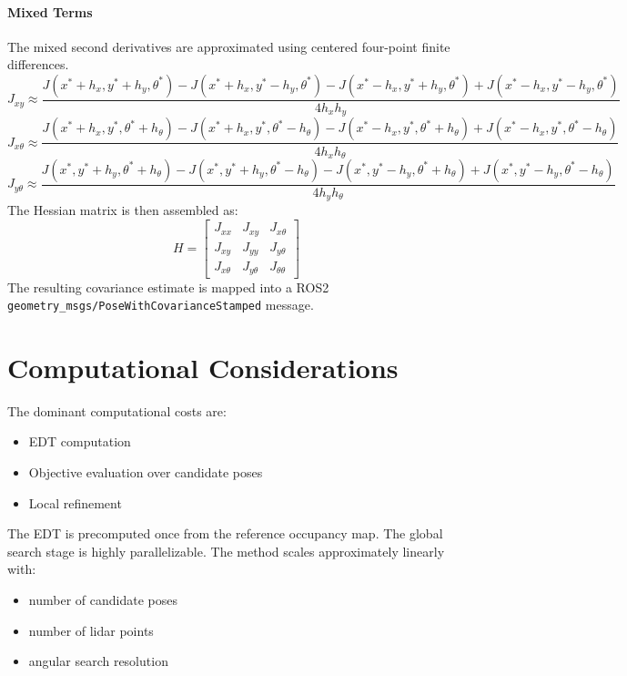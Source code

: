 \documentclass[11pt]{article}
\begin{document}
\paragraph{Mixed Terms}
The mixed second derivatives are approximated using centered
four-point finite differences.
\begin{equation}
J_{xy}
\approx
\frac{
J(x^*+h_x,y^*+h_y,\theta^*)
-
J(x^*+h_x,y^*-h_y,\theta^*)
-
J(x^*-h_x,y^*+h_y,\theta^*)
+
J(x^*-h_x,y^*-h_y,\theta^*)
}{
4 h_x h_y
}
\end{equation}
\begin{equation}
J_{x\theta}
\approx
\frac{
J(x^*+h_x,y^*,\theta^*+h_\theta)
-
J(x^*+h_x,y^*,\theta^*-h_\theta)
-
J(x^*-h_x,y^*,\theta^*+h_\theta)
+
J(x^*-h_x,y^*,\theta^*-h_\theta)
}{
4 h_x h_\theta
}
\end{equation}
\begin{equation}
J_{y\theta}
\approx
\frac{
J(x^*,y^*+h_y,\theta^*+h_\theta)
-
J(x^*,y^*+h_y,\theta^*-h_\theta)
-
J(x^*,y^*-h_y,\theta^*+h_\theta)
+
J(x^*,y^*-h_y,\theta^*-h_\theta)
}{
4 h_y h_\theta
}
\end{equation}
The Hessian matrix is then assembled as:
\begin{equation}
H =
\begin{bmatrix}
J_{xx} & J_{xy} & J_{x\theta} \\
J_{xy} & J_{yy} & J_{y\theta} \\
J_{x\theta} & J_{y\theta} & J_{\theta\theta}
\end{bmatrix}
\end{equation}
The resulting covariance estimate is mapped into a ROS2
\texttt{geometry\_msgs/PoseWithCovarianceStamped} message.

\section{Computational Considerations}

The dominant computational costs are:

\begin{itemize}
    \item EDT computation
    \item Objective evaluation over candidate poses
    \item Local refinement
\end{itemize}

The EDT is precomputed once from the reference occupancy map. The global search stage is highly parallelizable. The method scales approximately linearly with:
\begin{itemize}
    \item number of candidate poses
    \item number of lidar points
    \item angular search resolution
\end{itemize}
\end{document}
